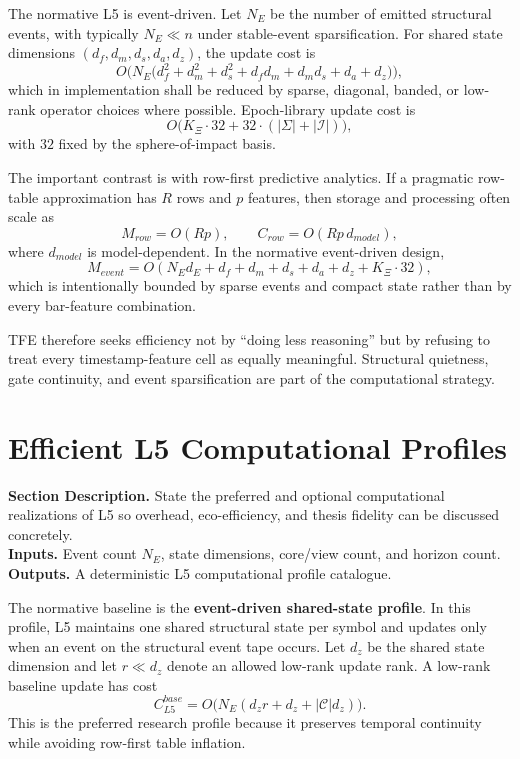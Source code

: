 \documentclass[11pt]{report}
\newcommand{\meta}[3]{\textbf{Section Description.} #1\\
\textbf{Inputs.} #2\\
\textbf{Outputs.} #3\par}
\begin{document}
The normative L5 is event-driven. Let $N_E$ be the number of emitted structural events, with typically $N_E\ll n$ under stable-event sparsification. For shared state dimensions $(d_f,d_m,d_s,d_a,d_z)$, the update cost is
\[
O\Big(N_E\big(d_f^2+d_m^2+d_s^2+d_f d_m+d_m d_s+d_a+d_z\big)\Big),
\]
which in implementation shall be reduced by sparse, diagonal, banded, or low-rank operator choices where possible. Epoch-library update cost is
\[
O\big(K_{\Xi}\cdot 32 + 32\cdot(|\Sigma|+|\mathcal{I}|)\big),
\]
with $32$ fixed by the sphere-of-impact basis.

The important contrast is with row-first predictive analytics. If a pragmatic row-table approximation has $R$ rows and $p$ features, then storage and processing often scale as
\[
M_{row}=O(Rp),\qquad C_{row}=O(Rp\,d_{model}),
\]
where $d_{model}$ is model-dependent. In the normative event-driven design,
\[
M_{event}=O(N_E d_E + d_f+d_m+d_s+d_a+d_z + K_{\Xi}\cdot 32),
\]
which is intentionally bounded by sparse events and compact state rather than by every bar-feature combination.

TFE therefore seeks efficiency not by ``doing less reasoning'' but by refusing to treat every timestamp-feature cell as equally meaningful. Structural quietness, gate continuity, and event sparsification are part of the computational strategy.

\section{Efficient L5 Computational Profiles}
\meta{State the preferred and optional computational realizations of L5 so overhead, eco-efficiency, and thesis fidelity can be discussed concretely.}{Event count $N_E$, state dimensions, core/view count, and horizon count.}{A deterministic L5 computational profile catalogue.}

The normative baseline is the \textbf{event-driven shared-state profile}. In this profile, L5 maintains one shared structural state per symbol and updates only when an event on the structural event tape occurs. Let $d_z$ be the shared state dimension and let $r\ll d_z$ denote an allowed low-rank update rank. A low-rank baseline update has cost
\[
C_{L5}^{base}=O\big(N_E(d_z r + d_z + |\mathcal{C}|d_z)\big).
\]
This is the preferred research profile because it preserves temporal continuity while avoiding row-first table inflation.
\end{document}
